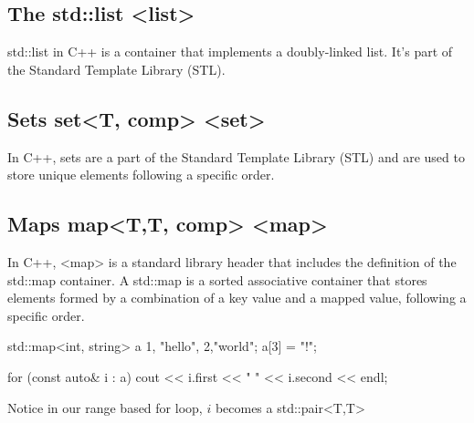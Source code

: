 \documentclass{report}
\begin{document}
    \bigbreak \noindent 
    \subsection{The std::list <list>}
    \bigbreak \noindent 
    \begin{concept}
       std::list in C++ is a container that implements a doubly-linked list. It's part of the Standard Template Library (STL). 
    \end{concept}
    

    \bigbreak \noindent 
    \subsection{Sets set<T, comp> <set>}
    \bigbreak \noindent 
    \begin{concept}
        In C++, sets are a part of the Standard Template Library (STL) and are used to store unique elements following a specific order.
    \end{concept}

    \bigbreak \noindent 
    \subsection{Maps map<T,T, comp> <map>}
    \bigbreak \noindent 
    \begin{concept}
    In C++, <map> is a standard library header that includes the definition of the std::map container. A std::map is a sorted associative container that stores elements formed by a combination of a key value and a mapped value, following a specific order. 
    \bigbreak \noindent 
    \begin{cppcode}
    std::map<int, string> a {{1, "hello"}, {2,"world"}};
    a[3] = "!";

    for (const auto& i : a) {
        cout << i.first << " " << i.second << endl;
    }
    \end{cppcode}
    \end{concept}
    \bigbreak \noindent 
    \begin{notebox}
       Notice in our range based for loop, $i$ becomes a std::pair<T,T>
    \end{notebox}
\end{document}

